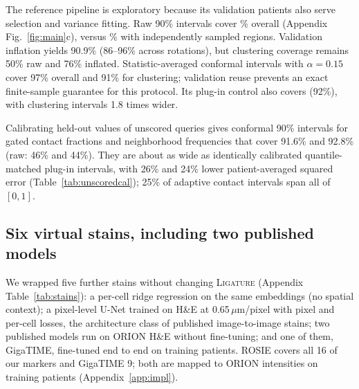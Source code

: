 \documentclass[10pt,letterpaper]{article}
\theoremstyle{definition}
\theoremstyle{remark}
\newcommand{\method}{\textnormal{\textsc{Ligature}}}
\begin{document}
\begin{table}[t]
\centering
\caption{Independent calibration (20/2/10/8 roles), three seeds and 40 test patients. Direct denotes the graph with stain inputs. MSE is relative to the protocol's plug-in. Coverage, width and 90\% interval score summarize all 136 statistics; width and score use training-patient standard deviations (lower is better). All intervals use the same ten calibration patients per rotation. $^\dagger$Post hoc (Appendix~\ref{app:simple}).}
\label{tab:forecast}

\end{table}

The reference pipeline is exploratory because its validation patients also serve selection and variance fitting. Raw 90\% intervals cover \RefCoverage\% overall (Appendix Fig.~\ref{fig:main}c), versus \IndependentCoverage\% with independently sampled regions. Validation inflation yields 90.9\% (86--96\% across rotations), but clustering coverage remains 50\% raw and 76\% inflated. Statistic-averaged conformal intervals with $\alpha=0.15$ cover 97\% overall and 91\% for clustering; validation reuse prevents an exact finite-sample guarantee for this protocol. Its plug-in control also covers (92\%), with clustering intervals 1.8 times wider.

Calibrating held-out values of unscored queries gives conformal 90\% intervals for gated contact fractions and neighborhood frequencies that cover 91.6\% and 92.8\% (raw: 46\% and 44\%). They are about as wide as identically calibrated quantile-matched plug-in intervals, with 26\% and 24\% lower patient-averaged squared error (Table~\ref{tab:unscoredcal}); 25\% of adaptive contact intervals span all of $[0,1]$.

\subsection{Six virtual stains, including two published models}
We wrapped five further stains without changing \method{} (Appendix Table~\ref{tab:stains}): a per-cell ridge regression on the same embeddings (no spatial context); a pixel-level U-Net trained on H\&E at 0.65\,$\mu$m/pixel with pixel and per-cell losses, the architecture class of published image-to-image stains; two published models run on ORION H\&E without fine-tuning; and one of them, GigaTIME, fine-tuned end to end on training patients. ROSIE \citep{rosie2025} covers all 16 of our markers and GigaTIME \citep{gigatime2025} 9; both are mapped to ORION intensities on training patients (Appendix~\ref{app:impl}).
\end{document}
